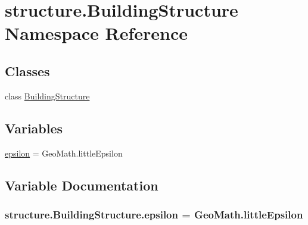 \hypertarget{namespacestructure_1_1_building_structure}{\section{structure.\-Building\-Structure Namespace Reference}
\label{namespacestructure_1_1_building_structure}
}
\subsection*{Classes}
\begin{DoxyCompactItemize}
\item 
class \hyperlink{classstructure_1_1_building_structure_1_1_building_structure}{Building\-Structure}
\end{DoxyCompactItemize}
\subsection*{Variables}
\begin{DoxyCompactItemize}
\item 
\hyperlink{namespacestructure_1_1_building_structure_a97bbd98602b0bb38298ca944f2f7945f}{epsilon} = Geo\-Math.\-little\-Epsilon
\end{DoxyCompactItemize}


\subsection{Variable Documentation}
\hypertarget{namespacestructure_1_1_building_structure_a97bbd98602b0bb38298ca944f2f7945f}{
\subsubsection[{epsilon}]{\setlength{\rightskip}{0pt plus 5cm}structure.\-Building\-Structure.\-epsilon = Geo\-Math.\-little\-Epsilon}}\label{namespacestructure_1_1_building_structure_a97bbd98602b0bb38298ca944f2f7945f}
